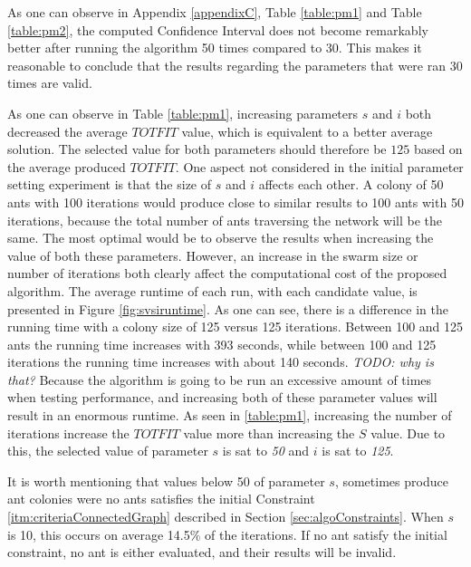 As one can observe in Appendix \ref{appendixC}, Table \vref{table:pm1} and Table \vref{table:pm2}, the computed Confidence Interval does not become remarkably better after running the algorithm 50 times compared to 30. This makes it reasonable to conclude that the results regarding the parameters that were ran 30 times are valid.
\newline

As one can observe in Table \vref{table:pm1}, increasing parameters $s$ and $i$ both decreased the average $TOTFIT$ value, which is equivalent to a better average solution. The selected value for both parameters should therefore be $125$ based on the average produced $TOTFIT$. One aspect not considered in the initial parameter setting experiment is that the size of $s$ and $i$ affects each other. A colony of 50 ants with 100 iterations would produce close to similar results to 100 ants with 50 iterations, because the total number of ants traversing the network will be the same. The most optimal would be to observe the results when increasing the value of both these parameters. However, an increase in the swarm size or number of iterations both clearly affect the computational cost of the proposed algorithm. The average runtime of each run, with each candidate value, is presented in Figure \ref{fig:svsiruntime}. As one can see, there is a difference in the running time with a colony size of 125 versus 125 iterations. Between 100 and 125 ants the running time increases with 393 seconds, while between 100 and 125 iterations the running time increases with about 140 seconds. \emph{\color{blue}TODO: why is that?} Because the algorithm is going to be run an excessive amount of times when testing performance, and increasing both of these parameter values will result in an enormous runtime. As seen in \ref{table:pm1}, increasing the number of iterations increase the $TOTFIT$ value more than increasing the $S$ value. Due to this, the selected value of parameter $s$ is sat to \textit{50} and $i$ is sat to \textit{125}.

It is worth mentioning that values below 50 of parameter $s$, sometimes produce ant colonies were no ants satisfies the initial Constraint \ref{itm:criteriaConnectedGraph} described in Section \vref{sec:algoConstraints}. When $s$ is 10, this occurs on average 14.5\% of the iterations. If no ant satisfy the initial constraint, no ant is either evaluated, and their results will be invalid. 

